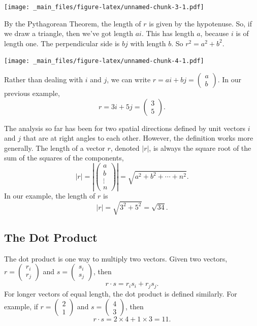 \documentclass[
]{book}
\theoremstyle{definition}
\theoremstyle{definition}
\theoremstyle{definition}
\theoremstyle{definition}
\theoremstyle{remark}
\begin{document}
\texttt{[image: \_main\_files/figure-latex/unnamed-chunk-3-1.pdf]}

By the Pythagorean Theorem, the length of \(r\) is given by the hypotenuse. So, if we draw a triangle, then we've got length \(ai\). This has length \(a\), because \(i\) is of length one. The perpendicular side is \(bj\) with length \(b\). So \(r^2 = a^2 + b^2\).

\texttt{[image: \_main\_files/figure-latex/unnamed-chunk-4-1.pdf]}

Rather than dealing with \(i\) and \(j\), we can write \(r = ai + bj = \begin{pmatrix}a \\ b \end{pmatrix}\). In our previous example, \[r = 3i + 5j = \begin{pmatrix}3 \\ 5 \end{pmatrix}.\]

The analysis so far has been for two spatial directions defined by unit vectors \(i\) and \(j\) that are at right angles to each other. However, the definition works more generally. The length of a vector \(r\), denoted \(|r|\), is always the square root of the sum of the squares of the components, \[|r| = \left|\begin{pmatrix} a \\ b \\ \vdots \\ n \end{pmatrix} \right| = \sqrt{a^2 + b^2 + \cdots + n^2}.\] In our example, the length of \(r\) is \[|r| = \sqrt{3^2+5^2} = \sqrt{34}.\]

\hypertarget{the-dot-product}{%
\subsection{The Dot Product}\label{the-dot-product}}

The dot product is one way to multiply two vectors. Given two vectors, \(r = \begin{pmatrix} r_i \\ r_j \end{pmatrix}\) and \(s = \begin{pmatrix} s_i \\ s_j \end{pmatrix}\), then \[r \cdot s = r_is_i + r_js_j.\] For longer vectors of equal length, the dot product is defined similarly. For example, if \(r = \begin{pmatrix} 2 \\ 1 \end{pmatrix}\) and \(s = \begin{pmatrix} 4 \\ 3 \end{pmatrix}\), then \[r \cdot s = 2 \times 4 + 1\times 3 = 11.\]
\end{document}
